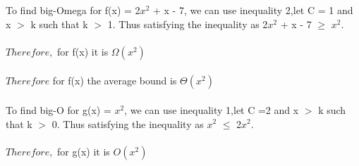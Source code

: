 \documentclass{article}
\begin{document}
To find big-Omega for f(x) =  2$x^2$ + x - 7, we can use inequality 2,let C = 1 and x $>$ k such that k $>$ 1. Thus satisfying the inequality as 2$x^2$ + x - 7 $\geq$ $x^2$. \\\\$Therefore,$ for f(x) it is $\Omega(x^2)$ \\ \\ 
$Therefore$ for f(x) the average bound is $\Theta(x^2)$ \\\\
To find big-O for g(x) = $x^2$, we can use inequality 1,let C =2 and  x $>$ k such that k $>$ 0. Thus satisfying the inequality as $x^2$ $\leq$ 2$x^2$. \\\\ $Therefore,$ for g(x) it is $O(x^2)$ \\ \\ 
\end{document}
